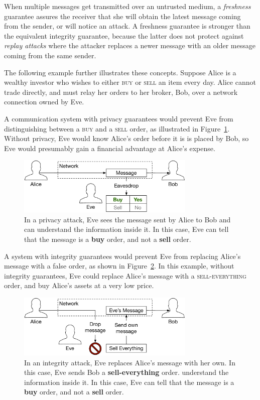 When multiple messages get transmitted over an untrusted medium, a
\textit{freshness} guarantee assures the receiver that she will obtain the
latest message coming from the sender, or will notice an attack. A freshness
guarantee is stronger than the equivalent integrity guarantee, because the
latter does not protect against \textit{replay attacks} where the attacker
replaces a newer message with an older message coming from the same sender.

The following example further illustrates these concepts. Suppose Alice is a
wealthy investor who wishes to either \textsc{buy} or \textsc{sell} an item
every day. Alice cannot trade directly, and must relay her orders to her
broker, Bob, over a network connection owned by Eve.

A communication system with privacy guarantees would prevent Eve from
distinguishing between a \textsc{buy} and a \textsc{sell} order, as illustrated
in Figure~\ref{fig:privacy_attack}. Without privacy, Eve would know Alice's
order before it is is placed by Bob, so Eve would presumably gain a financial
advantage at Alice's expense.

\begin{figure}[hbt]
  \centering
  \includegraphics[width=85mm]{figures/privacy_attack.pdf}
  \caption{
    In a privacy attack, Eve sees the message sent by Alice to Bob and can
    understand the information inside it. In this case, Eve can tell that the
    message is a \textbf{buy} order, and not a \textbf{sell} order.
  }
  \label{fig:privacy_attack}
\end{figure}

A system with integrity guarantees would prevent Eve from replacing Alice's
message with a false order, as shown in Figure~\ref{fig:integrity_attack}. In
this example, without integrity guarantees, Eve could replace Alice's message
with a \textsc{sell-everything} order, and buy Alice's assets at a very low
price.

\begin{figure}[hbt]
  \centering
  \includegraphics[width=85mm]{figures/integrity_attack.pdf}
  \caption{
    In an integrity attack, Eve replaces Alice's message with her own. In this
    case, Eve sends Bob a \textbf{sell-everything} order.
    understand the information inside it. In this case, Eve can tell that the
    message is a \textbf{buy} order, and not a \textbf{sell} order.
  }
  \label{fig:integrity_attack}
\end{figure}

